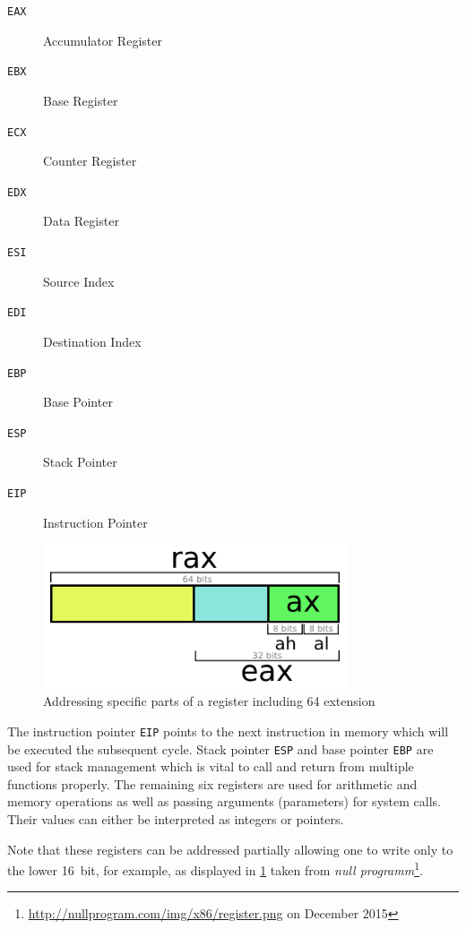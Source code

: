 \documentclass[article]{uibk}
\begin{document}
\begin{minipage}[t]{0.4\textwidth}
    \begin{description}
        \item[\texttt{EAX}] Accumulator Register
        \item[\texttt{EBX}] Base Register
        \item[\texttt{ECX}] Counter Register
        \item[\texttt{EDX}] Data Register
        \item[\texttt{ESI}] Source Index
        \item[\texttt{EDI}] Destination Index
        \item[\texttt{EBP}] Base Pointer
        \item[\texttt{ESP}] Stack Pointer
        \item[\texttt{EIP}] Instruction Pointer
    \end{description}
\end{minipage}
\begin{minipage}[t]{0.6\textwidth}
    \begin{figure}[H]
        \centering
        \includegraphics[width=0.8\textwidth]{gfx/single_register.png}
        \caption{Addressing specific parts of a register including \SI{64}{\bit} extension}
        \label{fig:single_register}
    \end{figure}
\end{minipage}
\bigskip

The instruction pointer \texttt{EIP} points to the next instruction in memory
which will be executed the subsequent cycle. Stack pointer \texttt{ESP} and
base pointer \texttt{EBP} are used for stack management which is vital to call
and return from multiple functions properly. The remaining six registers are
used for arithmetic and memory operations as well as passing arguments
(parameters) for system calls. Their values can either be interpreted as
integers or pointers.

Note that these registers can be addressed partially allowing one to write only
to the lower \SI{16}{bit}, for example, as displayed in
\cref{fig:single_register} taken from \textit{null
programm}\footnote{\url{http://nullprogram.com/img/x86/register.png} on
December 2015}.
\end{document}
